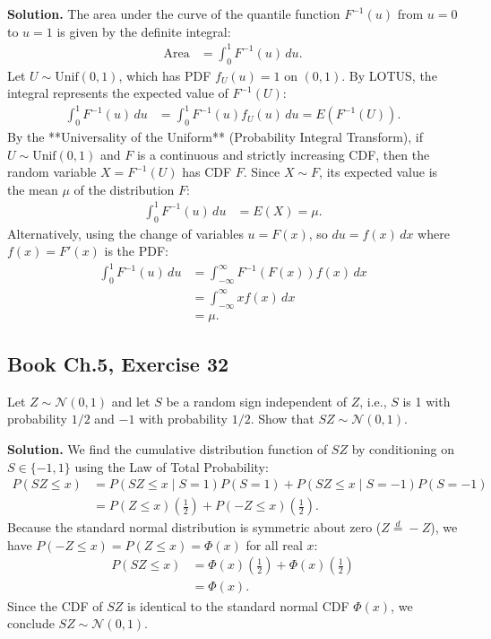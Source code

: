 \documentclass[11pt,a4paper]{article}
\begin{document}
\noindent \textbf{Solution.} The area under the curve of the quantile function $F^{-1}(u)$ from $u = 0$ to $u = 1$ is given by the definite integral:
\begin{align*}
\text{Area} &= \int_{0}^{1} F^{-1}(u) \, du.
\end{align*}
Let $U \sim \text{Unif}(0, 1)$, which has PDF $f_U(u) = 1$ on $(0, 1)$. By LOTUS, the integral represents the expected value of $F^{-1}(U)$:
\begin{align*}
\int_{0}^{1} F^{-1}(u) \, du &= \int_{0}^{1} F^{-1}(u) f_U(u) \, du = E\left( F^{-1}(U) \right).
\end{align*}
By the **Universality of the Uniform** (Probability Integral Transform), if $U \sim \text{Unif}(0, 1)$ and $F$ is a continuous and strictly increasing CDF, then the random variable $X = F^{-1}(U)$ has CDF $F$. Since $X \sim F$, its expected value is the mean $\mu$ of the distribution $F$:
\begin{align*}
\int_{0}^{1} F^{-1}(u) \, du &= E(X) = \mu.
\end{align*}
Alternatively, using the change of variables $u = F(x)$, so $du = f(x) \, dx$ where $f(x) = F'(x)$ is the PDF:
\begin{align*}
\int_{0}^{1} F^{-1}(u) \, du &= \int_{-\infty}^{\infty} F^{-1}(F(x)) f(x) \, dx \\
&= \int_{-\infty}^{\infty} x f(x) \, dx \\
&= \mu.
\end{align*}

\vspace{10pt}
\subsection{Book Ch.5, Exercise 32}
\begin{tcolorbox}[title={Book Ch.5, Exercise 32}]
Let $Z \sim \mathcal{N}(0, 1)$ and let $S$ be a random sign independent of $Z$, i.e., $S$ is 1 with probability $1/2$ and $-1$ with probability $1/2$. Show that $SZ \sim \mathcal{N}(0, 1)$.
\end{tcolorbox}

\noindent \textbf{Solution.} We find the cumulative distribution function of $SZ$ by conditioning on $S \in \{-1, 1\}$ using the Law of Total Probability:
\begin{align*}
P(SZ \le x) &= P(SZ \le x \mid S = 1) P(S = 1) + P(SZ \le x \mid S = -1) P(S = -1) \\
&= P(Z \le x) \left(\frac{1}{2}\right) + P(-Z \le x) \left(\frac{1}{2}\right).
\end{align*}
Because the standard normal distribution is symmetric about zero ($Z \stackrel{d}{=} -Z$), we have $P(-Z \le x) = P(Z \le x) = \Phi(x)$ for all real $x$:
\begin{align*}
P(SZ \le x) &= \Phi(x) \left(\frac{1}{2}\right) + \Phi(x) \left(\frac{1}{2}\right) \\
&= \Phi(x).
\end{align*}
Since the CDF of $SZ$ is identical to the standard normal CDF $\Phi(x)$, we conclude $SZ \sim \mathcal{N}(0, 1)$.
\end{document}
